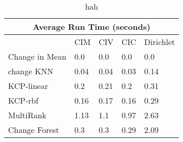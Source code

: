
\begin{table}[!ht]
\centering
{
\begin{tabular}{ |p{2cm}|p{1.5cm}|p{1.5cm}|p{1.5cm}|p{1.5cm}|}
\hline
\multicolumn{5}{|c|}{Average Run Time (seconds)} \\
\hline

\hline
 & CIM & CIV & CIC & Dirichlet \\
\hline
\hline
Change in Mean & 0.0 & 0.0 & 0.0 & 0.0 \\
change KNN & 0.04 & 0.04 & 0.03 & 0.14 \\
KCP-linear & 0.2 & 0.21 & 0.2 & 0.31 \\
KCP-rbf & 0.16 & 0.17 & 0.16 & 0.29 \\
MultiRank & 1.13 & 1.1 & 0.97 & 2.63 \\
Change Forest & 0.3 & 0.3 & 0.29 & 2.09 \\
\hline
\end{tabular}}
\\
\caption{hah}
\vspace{10pt}
\label{tab:yourlabel}
\end{table}